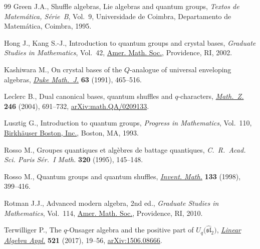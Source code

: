 \documentclass[11pt]{article}
\numberwithin{equation}{section}
\numberwithin{equation}{section}
\begin{document}
\begin{thebibliography}{99}
Green J.A., Shuffle algebras, {L}ie algebras and quantum groups, \textit{Textos
 de Matem\'atica, S\'erie~B}, Vol.~9, Universidade de Coimbra,
 Departamento de Matem\'atica, Coimbra, 1995.

Hong J., Kang S.-J., Introduction to quantum groups and crystal bases,
 \textit{Graduate Studies in Mathematics}, Vol.~42, \href{https://doi.org/10.1090/gsm/042}{Amer. Math. Soc.}, Providence, RI, 2002.

Kashiwara M., On crystal bases of the {$Q$}-analogue of universal enveloping
 algebras, \href{https://doi.org/10.1215/S0012-7094-91-06321-0}{\textit{Duke Math.~J.}} \textbf{63} (1991), 465--516.

Leclerc B., Dual canonical bases, quantum shuffles and {$q$}-characters,
 \href{https://doi.org/10.1007/s00209-003-0609-9}{\textit{Math.~Z.}} \textbf{246} (2004), 691--732, \href{https://arxiv.org/abs/math.QA/0209133}{arXiv:math.QA/0209133}.

Lusztig G., Introduction to quantum groups, \textit{Progress in Mathematics},
 Vol.~110, \href{https://doi.org/10.1007/978-0-8176-4717-9}{Birkh\"{a}user Boston, Inc.}, Boston, MA, 1993.

Rosso M., Groupes quantiques et alg\`ebres de battage quantiques,
 \textit{C.~R.~Acad. Sci. Paris S\'er.~I Math.} \textbf{320} (1995),
 145--148.

Rosso M., Quantum groups and quantum shuffles, \href{https://doi.org/10.1007/s002220050249}{\textit{Invent. Math.}} \textbf{133} (1998), 399--416.

Rotman J.J., Advanced modern algebra, 2nd ed., \textit{Graduate Studies in Mathematics},
 Vol.~114, \href{https://doi.org/10.1090/gsm/114}{Amer. Math. Soc.}, Providence, RI, 2010.

Terwilliger P., The {$q$}-{O}nsager algebra and the positive part of
 {$U_q\big(\widehat{\mathfrak{sl}}_2\big)$}, \href{https://doi.org/10.1016/j.laa.2017.01.027}{\textit{Linear Algebra Appl.}}
 \textbf{521} (2017), 19--56, \href{https://arxiv.org/abs/1506.08666}{arXiv:1506.08666}.

\end{thebibliography}
\end{document}
